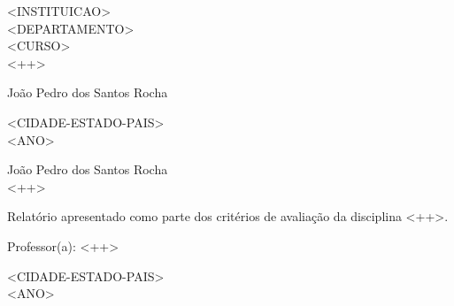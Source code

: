 \documentclass[a4paper, 12pt]{article}
\begin{document}
\begin{titlepage}
	\begin{center}
	\begin{figure}[!ht]
	\centering
	\end{figure}
		<INSTITUICAO>\\
		<DEPARTAMENTO>\\ 
	        <CURSO>\\
		\vspace{7cm}
		<++> %
		\vspace{3cm}
	\end{center}
	
	\begin{flushright}
			João Pedro dos Santos Rocha \\
	 \end{flushright}

	\begin{center}
	\vspace{\fill}
	 <CIDADE-ESTADO-PAIS>\\
         <ANO>
	\end{center}
\end{titlepage}

\begin{titlepage}
	\begin{center}
		João Pedro dos Santos Rocha\\
      \vspace{7cm}
		<++> %
	\end{center}
\vspace{3cm}
	\begin{flushright}
   \begin{list}{}{
      \setlength{\leftmargin}{5cm}
      \setlength{\rightmargin}{0cm}
      \setlength{\labelwidth}{0pt}
      \setlength{\labelsep}{\leftmargin}}
      \item Relatório  apresentado  como  parte  dos  critérios de avaliação da
	    disciplina <++>.

       \item Professor(a): <++>
   \end{list}
	\end{flushright}

	\begin{center}
		\vspace{\fill}
		 <CIDADE-ESTADO-PAIS>\\
		 <ANO>
	\end{center}
\end{titlepage}
\end{document}
